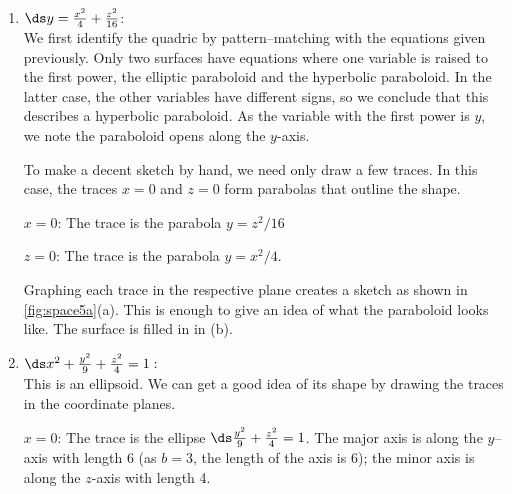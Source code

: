 {\mbox{}\\[-\baselineskip]\begin{enumerate}
	\item $\ds y=\frac{x^2}{4}+\frac{z^2}{16}$:\\
	We first identify the quadric by pattern--matching with the equations given previously. Only two surfaces have equations where one variable is raised to the first power, the elliptic paraboloid and the hyperbolic paraboloid. In the latter case, the other variables have different signs, so we conclude that this describes a hyperbolic paraboloid. As the variable with the first power is $y$, we note the paraboloid opens along the $y$-axis. 
	
	To make a decent sketch by hand, we need only draw a few traces. In this case, the traces $x=0$ and $z=0$ form parabolas that outline the shape.
	
	$x=0$:	The trace is the parabola $y=z^2/16$
	
	$z=0$: 	The trace is the parabola $y=x^2/4$.
	
	Graphing each trace in the respective plane creates a sketch as shown in \autoref{fig:space5a}(a). This is enough to give an idea of what the paraboloid looks like. The surface is filled in in (b).
	
	\item		$\ds x^2+\frac{y^2}{9}+\frac{z^2}{4}=1:$\\
	This is an ellipsoid. We can get a good idea of its shape by drawing the traces in the coordinate planes.
	
	$x=0$: 	The trace is the ellipse $\ds\frac{y^2}{9}+\frac{z^2}{4}=1$. The major axis is along the $y$--axis with length 6 (as $b=3$, the length of the axis is 6); the minor axis is along the $z$-axis with length 4.
	

\end{enumerate}}
